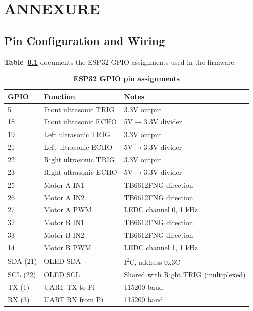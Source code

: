 \chapter*{ANNEXURE}
\label{ch:annexures}
\setcounter{section}{0}
\renewcommand{\thesection}{\arabic{section}}

\section{Pin Configuration and Wiring}
\label{sec:pinout}

\textbf{Table~\ref{tab:esp32_pins}} documents the ESP32 GPIO assignments used in the firmware.

\begin{table}[H]
\centering
\caption[ESP32 GPIO pin assignments]{\textbf{ESP32 GPIO pin assignments}}
\label{tab:esp32_pins}
\begin{tabularx}{\textwidth}{|l|l|X|}
\hline
\textbf{GPIO} & \textbf{Function} & \textbf{Notes} \\
\hline
5 & Front ultrasonic TRIG & 3.3V output \\
\hline
18 & Front ultrasonic ECHO & 5V$\to$3.3V divider \\
\hline
19 & Left ultrasonic TRIG & 3.3V output \\
\hline
21 & Left ultrasonic ECHO & 5V$\to$3.3V divider \\
\hline
22 & Right ultrasonic TRIG & 3.3V output \\
\hline
23 & Right ultrasonic ECHO & 5V$\to$3.3V divider \\
\hline
25 & Motor A IN1 & TB6612FNG direction \\
\hline
26 & Motor A IN2 & TB6612FNG direction \\
\hline
27 & Motor A PWM & LEDC channel 0, 1 kHz \\
\hline
32 & Motor B IN1 & TB6612FNG direction \\
\hline
33 & Motor B IN2 & TB6612FNG direction \\
\hline
14 & Motor B PWM & LEDC channel 1, 1 kHz \\
\hline
SDA (21) & OLED SDA & I\textsuperscript{2}C, address 0x3C \\
\hline
SCL (22) & OLED SCL & Shared with Right TRIG (multiplexed) \\
\hline
TX (1) & UART TX to Pi & 115200 baud \\
\hline
RX (3) & UART RX from Pi & 115200 baud \\
\hline
\end{tabularx}
\end{table}

